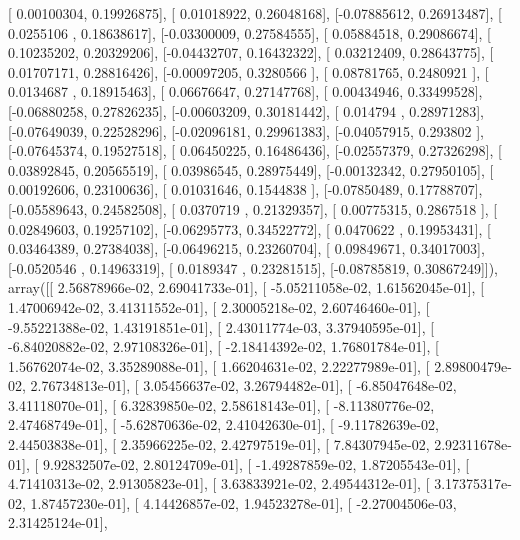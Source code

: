 \documentclass{article}
\begin{document}
       [ 0.00100304,  0.19926875],
       [ 0.01018922,  0.26048168],
       [-0.07885612,  0.26913487],
       [ 0.0255106 ,  0.18638617],
       [-0.03300009,  0.27584555],
       [ 0.05884518,  0.29086674],
       [ 0.10235202,  0.20329206],
       [-0.04432707,  0.16432322],
       [ 0.03212409,  0.28643775],
       [ 0.01707171,  0.28816426],
       [-0.00097205,  0.3280566 ],
       [ 0.08781765,  0.2480921 ],
       [ 0.0134687 ,  0.18915463],
       [ 0.06676647,  0.27147768],
       [ 0.00434946,  0.33499528],
       [-0.06880258,  0.27826235],
       [-0.00603209,  0.30181442],
       [ 0.014794  ,  0.28971283],
       [-0.07649039,  0.22528296],
       [-0.02096181,  0.29961383],
       [-0.04057915,  0.293802  ],
       [-0.07645374,  0.19527518],
       [ 0.06450225,  0.16486436],
       [-0.02557379,  0.27326298],
       [ 0.03892845,  0.20565519],
       [ 0.03986545,  0.28975449],
       [-0.00132342,  0.27950105],
       [ 0.00192606,  0.23100636],
       [ 0.01031646,  0.1544838 ],
       [-0.07850489,  0.17788707],
       [-0.05589643,  0.24582508],
       [ 0.0370719 ,  0.21329357],
       [ 0.00775315,  0.2867518 ],
       [ 0.02849603,  0.19257102],
       [-0.06295773,  0.34522772],
       [ 0.0470622 ,  0.19953431],
       [ 0.03464389,  0.27384038],
       [-0.06496215,  0.23260704],
       [ 0.09849671,  0.34017003],
       [-0.0520546 ,  0.14963319],
       [ 0.0189347 ,  0.23281515],
       [-0.08785819,  0.30867249]]), array([[  2.56878966e-02,   2.69041733e-01],
       [ -5.05211058e-02,   1.61562045e-01],
       [  1.47006942e-02,   3.41311552e-01],
       [  2.30005218e-02,   2.60746460e-01],
       [ -9.55221388e-02,   1.43191851e-01],
       [  2.43011774e-03,   3.37940595e-01],
       [ -6.84020882e-02,   2.97108326e-01],
       [ -2.18414392e-02,   1.76801784e-01],
       [  1.56762074e-02,   3.35289088e-01],
       [  1.66204631e-02,   2.22277989e-01],
       [  2.89800479e-02,   2.76734813e-01],
       [  3.05456637e-02,   3.26794482e-01],
       [ -6.85047648e-02,   3.41118070e-01],
       [  6.32839850e-02,   2.58618143e-01],
       [ -8.11380776e-02,   2.47468749e-01],
       [ -5.62870636e-02,   2.41042630e-01],
       [ -9.11782639e-02,   2.44503838e-01],
       [  2.35966225e-02,   2.42797519e-01],
       [  7.84307945e-02,   2.92311678e-01],
       [  9.92832507e-02,   2.80124709e-01],
       [ -1.49287859e-02,   1.87205543e-01],
       [  4.71410313e-02,   2.91305823e-01],
       [  3.63833921e-02,   2.49544312e-01],
       [  3.17375317e-02,   1.87457230e-01],
       [  4.14426857e-02,   1.94523278e-01],
       [ -2.27004506e-03,   2.31425124e-01],
\end{document}
